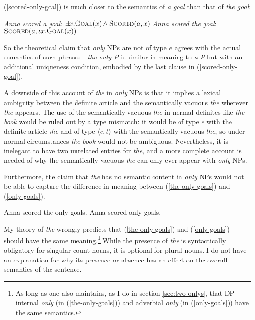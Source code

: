 (\ref{scored-only-goal}) is much closer to the semantics of \textit{a goal} than that of \textit{the goal}:

\begin{exe}
	\ex \label{a-goal} \textit{Anna scored a goal}: $\exists x . \textsc{Goal}(x) \land \textsc{Scored}(a, x)$
	\ex \label{the-goal} \textit{Anna scored the goal}: $\textsc{Scored}(a, \iota x . \textsc{Goal}(x))$
\end{exe}

So the theoretical claim that \textit{only} NPs are not of type $e$ agrees with the actual semantics of such phrases---\textit{the only P} is similar in meaning to \textit{a P} but with an additional uniqueness condition, embodied by the last clause in (\ref{scored-only-goal}).

A downside of this account of \textit{the} in \textit{only} NPs is that it implies a lexical ambiguity between the definite article and the semantically vacuous \textit{the} wherever \textit{the} appears. The use of the semantically vacuous \textit{the} in normal definites like \textit{the book} would be ruled out by a type mismatch: it would be of type $e$ with the definite article \textit{the} and of type $\langle e, t \rangle$ with the semantically vacuous \textit{the}, so under normal circumstances \textit{the book} would not be ambiguous. Nevertheless, it is inelegant to have two unrelated entries for \textit{the}, and a more complete account is needed of why the semantically vacuous \textit{the} can only ever appear with \textit{only} NPs.

Furthermore, the claim that \textit{the} has no semantic content in \textit{only} NPs would not be able to capture the difference in meaning between (\ref{the-only-goals}) and (\ref{only-goals}).

\begin{exe}
	\ex \label{the-only-goals} Anna scored the only goals.
	\ex \label{only-goals} Anna scored only goals.
\end{exe}

My theory of \textit{the} wrongly predicts that (\ref{the-only-goals}) and (\ref{only-goals}) should have the same meaning.\footnote{As long as one also maintains, as I do in section \ref{sec:two-onlys}, that DP-internal \textit{only} (in (\ref{the-only-goals})) and adverbial \textit{only} (in (\ref{only-goals})) have the same semantics.} While the presence of \textit{the} is syntactically obligatory for singular count nouns, it is optional for plural nouns. I do not have an explanation for why its presence or absence has an effect on the overall semantics of the sentence.

